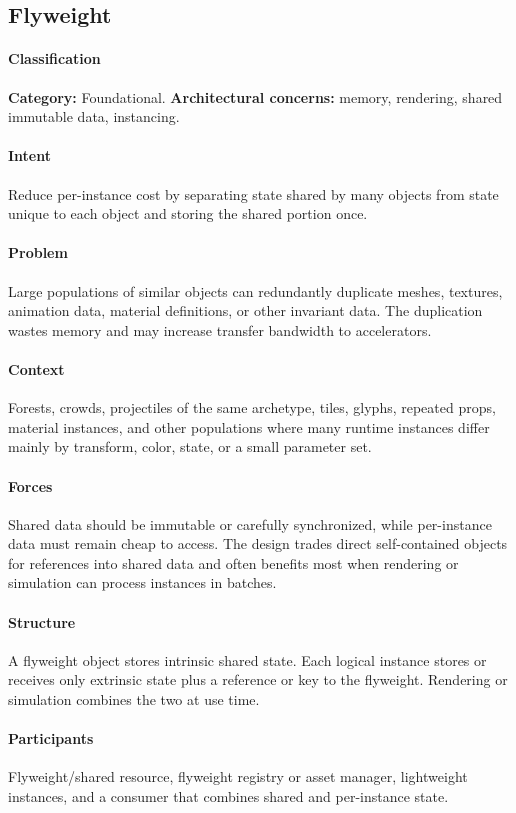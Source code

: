 \documentclass[11pt]{article}
\begin{document}
\subsection{Flyweight}\label{pat:flyweight}
\paragraph{Classification} \textbf{Category:} Foundational. \textbf{Architectural concerns:} memory, rendering, shared immutable data, instancing.
\paragraph{Intent} Reduce per-instance cost by separating state shared by many objects from state unique to each object and storing the shared portion once.
\paragraph{Problem} Large populations of similar objects can redundantly duplicate meshes, textures, animation data, material definitions, or other invariant data. The duplication wastes memory and may increase transfer bandwidth to accelerators.
\paragraph{Context} Forests, crowds, projectiles of the same archetype, tiles, glyphs, repeated props, material instances, and other populations where many runtime instances differ mainly by transform, color, state, or a small parameter set.
\paragraph{Forces} Shared data should be immutable or carefully synchronized, while per-instance data must remain cheap to access. The design trades direct self-contained objects for references into shared data and often benefits most when rendering or simulation can process instances in batches.
\paragraph{Structure} A flyweight object stores intrinsic shared state. Each logical instance stores or receives only extrinsic state plus a reference or key to the flyweight. Rendering or simulation combines the two at use time.
\paragraph{Participants} Flyweight/shared resource, flyweight registry or asset manager, lightweight instances, and a consumer that combines shared and per-instance state.
\end{document}
